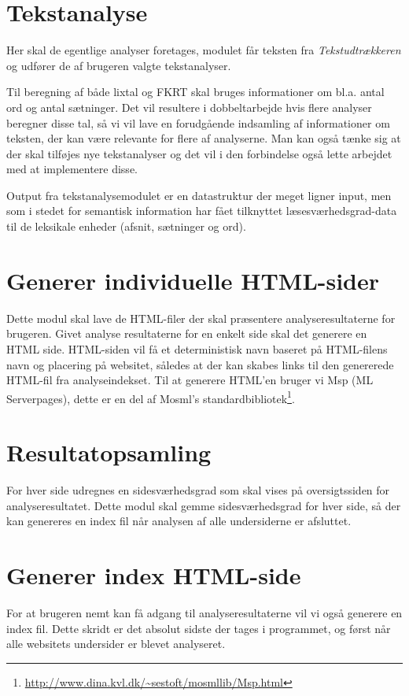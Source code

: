 \documentclass[a4paper,oneside,article, titlepage]{memoir}
\begin{document}
\section{Tekstanalyse}
Her skal de egentlige analyser foretages, modulet får teksten fra
\textit{Tekstudtrækkeren} og udfører de af brugeren valgte
tekstanalyser.

Til beregning af både lixtal og FKRT skal bruges informationer om
bl.a. antal ord og antal sætninger. Det vil resultere i dobbeltarbejde
hvis flere analyser beregner disse tal, så vi vil lave en forudgående
indsamling af informationer om teksten, der kan være relevante for
flere af analyserne. Man kan også tænke sig at der skal tilføjes nye
tekstanalyser og det vil i den forbindelse også lette arbejdet med at
implementere disse.

Output fra tekstanalysemodulet er en datastruktur der meget ligner
input, men som i stedet for semantisk information har fået tilknyttet
læsesværhedsgrad-data til de leksikale enheder (afsnit, sætninger og
ord).

\section{Generer individuelle HTML-sider}
Dette modul skal lave de HTML-filer der skal præsentere
analyseresultaterne for brugeren. Givet analyse resultaterne for en
enkelt side skal det generere en HTML side. HTML-siden vil få et
deterministisk navn baseret på HTML-filens navn og placering på
websitet, således at der kan skabes links til den genererede HTML-fil
fra analyseindekset. Til at generere HTML'en bruger vi Msp (ML
Serverpages), dette er en del af Mosml's
standardbibliotek\footnote{\url{http://www.dina.kvl.dk/~sestoft/mosmllib/Msp.html}}.

\section{Resultatopsamling}
For hver side udregnes en sidesværhedsgrad som skal vises på
oversigtssiden for analyseresultatet. Dette modul skal gemme
sidesværhedsgrad for hver side, så der kan genereres en index fil når
analysen af alle undersiderne er afsluttet.

\section{Generer index HTML-side}
For at brugeren nemt kan få adgang til analyseresultaterne vil vi også
generere en index fil. Dette skridt er det absolut sidste der tages i
programmet, og først når alle websitets undersider er blevet
analyseret.
\end{document}
